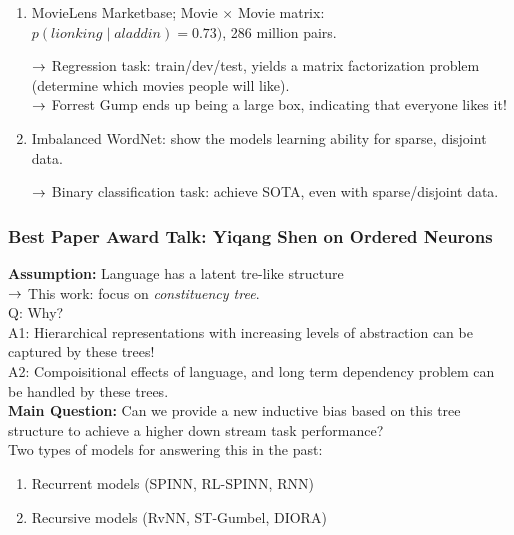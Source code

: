 \begin{enumerate}
    \item MovieLens Marketbase; Movie $\times$ Movie matrix: $p(lion king \mid aladdin) = 0.73)$, 286 million pairs.
    
    $\rightarrow$ Regression task: train/dev/test, yields a matrix factorization problem (determine which movies people will like). \\
    
    $\rightarrow$ Forrest Gump ends up being a large box, indicating that everyone likes it!
    
    \item Imbalanced WordNet: show the models learning ability for sparse, disjoint data.
    
    $\rightarrow$ Binary classification task: achieve SOTA, even with sparse/disjoint data.
\end{enumerate}

\subsubsection{Best Paper Award Talk: Yiqang Shen on Ordered Neurons~\cite{shen2019ordered}}

{\bf Assumption:} Language has a latent tre-like structure \\

$\rightarrow$ This work: focus on {\it constituency tree}. \\

Q: Why? \\

A1: Hierarchical representations with increasing levels of abstraction can be captured by these trees! \\

A2: Compoisitional effects of language, and long term dependency problem can be handled by these trees. \\

{\bf Main Question:} Can we provide a new inductive bias based on this tree structure to achieve a higher down stream task performance? \\

Two types of models for answering this in the past:
\begin{enumerate}
    \item Recurrent models (SPINN, RL-SPINN, RNN)
    \item Recursive models (RvNN, ST-Gumbel, DIORA)
\end{enumerate}

